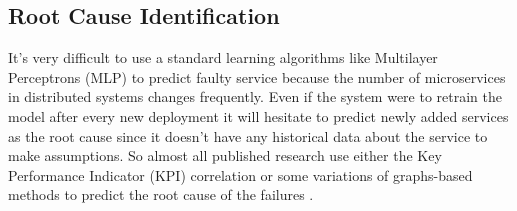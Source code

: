 \subsection{Root Cause Identification}

It's very difficult to use a standard learning algorithms like Multilayer Perceptrons (MLP) to predict faulty service because the number of microservices in distributed systems changes frequently. Even if the system were to retrain the model after every new deployment it will hesitate to predict newly added services as the root cause since it doesn't have any historical data about the service to make assumptions. So almost all published research use either the Key Performance Indicator (KPI) correlation or some variations of graphs-based methods to predict the root cause of the failures \citep{soldani2021anomaly}.

